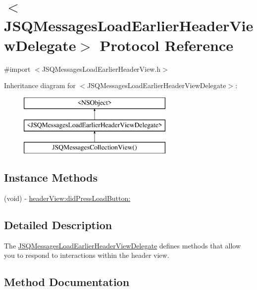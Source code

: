 \hypertarget{protocol_j_s_q_messages_load_earlier_header_view_delegate-p}{}\section{$<$J\+S\+Q\+Messages\+Load\+Earlier\+Header\+View\+Delegate$>$ Protocol Reference}
\label{protocol_j_s_q_messages_load_earlier_header_view_delegate-p}


{\ttfamily \#import $<$J\+S\+Q\+Messages\+Load\+Earlier\+Header\+View.\+h$>$}

Inheritance diagram for $<$J\+S\+Q\+Messages\+Load\+Earlier\+Header\+View\+Delegate$>$\+:\begin{figure}[H]
\begin{center}
\leavevmode
\includegraphics[height=3.000000cm]{protocol_j_s_q_messages_load_earlier_header_view_delegate-p}
\end{center}
\end{figure}
\subsection*{Instance Methods}
\begin{DoxyCompactItemize}
\item 
(void) -\/ \hyperlink{protocol_j_s_q_messages_load_earlier_header_view_delegate-p_a7551db75f303eaf0d392b2a936287f22}{header\+View\+:did\+Press\+Load\+Button\+:}
\end{DoxyCompactItemize}


\subsection{Detailed Description}
The {\ttfamily \hyperlink{protocol_j_s_q_messages_load_earlier_header_view_delegate-p}{J\+S\+Q\+Messages\+Load\+Earlier\+Header\+View\+Delegate}} defines methods that allow you to respond to interactions within the header view. 

\subsection{Method Documentation}
\hypertarget{protocol_j_s_q_messages_load_earlier_header_view_delegate-p_a7551db75f303eaf0d392b2a936287f22}{}
